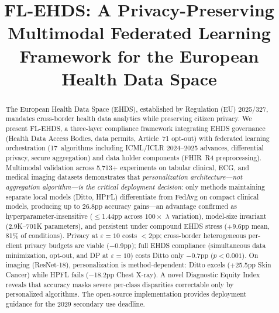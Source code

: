 \documentclass[conference]{IEEEtran}
\begin{document}
\title{FL-EHDS: A Privacy-Preserving Multimodal Federated Learning Framework for the European Health Data Space}

\author{
}

\maketitle

\begin{abstract}
The European Health Data Space (EHDS), established by Regulation (EU) 2025/327, mandates cross-border health data analytics while preserving citizen privacy. We present FL-EHDS, a three-layer compliance framework integrating EHDS governance (Health Data Access Bodies, data permits, Article~71 opt-out) with federated learning orchestration (17~algorithms including ICML/ICLR 2024--2025 advances, differential privacy, secure aggregation) and data holder components (FHIR~R4 preprocessing). Multimodal validation across 5,713+ experiments on tabular clinical, ECG, and medical imaging datasets demonstrates that \textit{personalization architecture---not aggregation algorithm---is the critical deployment decision}: only methods maintaining separate local models (Ditto, HPFL) differentiate from FedAvg on compact clinical models, producing up to 26.8pp accuracy gains---an advantage confirmed as hyperparameter-insensitive ($\leq$1.44pp across $100\times$ $\lambda$ variation), model-size invariant (2.9K--701K parameters), and persistent under compound EHDS stress ($+$9.6pp mean, 81\% of conditions). Privacy at $\varepsilon{=}10$ costs $<$2pp; cross-border heterogeneous per-client privacy budgets are viable ($-$0.9pp); full EHDS compliance (simultaneous data minimization, opt-out, and DP at $\varepsilon{=}10$) costs Ditto only $-$0.7pp ($p{<}0.001$). On imaging (ResNet-18), personalization is method-dependent: Ditto excels ($+$25.5pp Skin Cancer) while HPFL fails ($-$18.2pp Chest X-ray). A novel Diagnostic Equity Index reveals that accuracy masks severe per-class disparities correctable only by personalized algorithms. The open-source implementation provides deployment guidance for the 2029 secondary use deadline.
\end{abstract}
\end{document}
